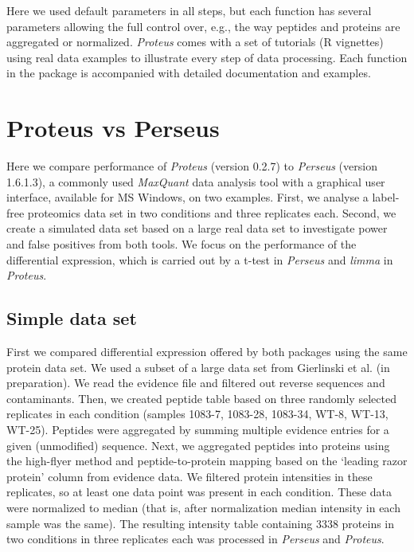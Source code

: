 \documentclass[]{article}
\begin{document}
Here we used default parameters in all steps, but each function has
several parameters allowing the full control over, e.g., the way
peptides and proteins are aggregated or normalized. \emph{Proteus} comes
with a set of tutorials (R vignettes) using real data examples to
illustrate every step of data processing. Each function in the package
is accompanied with detailed documentation and examples.

\section{Proteus vs Perseus}\label{proteus-vs-perseus}

Here we compare performance of \emph{Proteus} (version 0.2.7) to
\emph{Perseus} (version 1.6.1.3), a commonly used \emph{MaxQuant} data
analysis tool with a graphical user interface, available for MS Windows,
on two examples. First, we analyse a label-free proteomics data set in
two conditions and three replicates each. Second, we create a simulated
data set based on a large real data set to investigate power and false
positives from both tools. We focus on the performance of the
differential expression, which is carried out by a t-test in
\emph{Perseus} and \emph{limma} in \emph{Proteus}.

\subsection{Simple data set}\label{simple-data-set}

First we compared differential expression offered by both packages using
the same protein data set. We used a subset of a large data set from
Gierlinski et al. (in preparation). We read the evidence file and
filtered out reverse sequences and contaminants. Then, we created
peptide table based on three randomly selected replicates in each
condition (samples 1083-7, 1083-28, 1083-34, WT-8, WT-13, WT-25).
Peptides were aggregated by summing multiple evidence entries for a
given (unmodified) sequence. Next, we aggregated peptides into proteins
using the high-flyer method and peptide-to-protein mapping based on the
`leading razor protein' column from evidence data. We filtered protein
intensities in these replicates, so at least one data point was present
in each condition. These data were normalized to median (that is, after
normalization median intensity in each sample was the same). The
resulting intensity table containing 3338 proteins in two conditions in
three replicates each was processed in \emph{Perseus} and
\emph{Proteus}.
\end{document}
